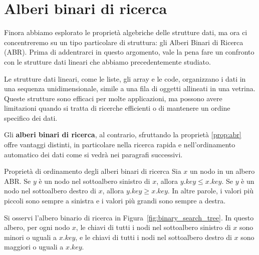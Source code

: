 \section{Alberi binari di ricerca}
Finora abbiamo esplorato le proprietà algebriche delle strutture dati, ma ora ci concentreremo su un tipo particolare di struttura: gli Alberi Binari di Ricerca (ABR). Prima di addentrarci in questo argomento, vale la pena fare un confronto con le strutture dati lineari che abbiamo precedentemente studiato.

Le strutture dati lineari, come le liste, gli array e le code, organizzano i dati in una sequenza unidimensionale, simile a una fila di oggetti allineati in una vetrina. Queste strutture sono efficaci per molte applicazioni, ma possono avere limitazioni quando si tratta di ricerche efficienti o di mantenere un ordine specifico dei dati.

Gli \textbf{alberi binari di ricerca}, al contrario, sfruttando la proprietà \ref{prop:abr} offre vantaggi distinti, in particolare nella ricerca rapida e nell'ordinamento automatico dei dati come si vedrà nei paragrafi successivi.


\begin{axiombox}{Proprietà di ordinamento degli alberi binari di ricerca}\label{prop:abr}
Sia $x$ un nodo in un albero \textsc{ABR}. Se $y$ è un nodo nel sottoalbero sinistro di $x$, allora $y.key \leq x.key$. Se $y$ è un nodo nel sottoalbero destro di $x$, allora $y.key \geq x.key$. In altre parole, i valori più piccoli sono sempre a sinistra e i valori più grandi sono sempre a destra.
\end{axiombox}


\begin{example}
	Si osservi l'albero binario di ricerca in Figura~\ref{fig:binary_search_tree}. In questo albero, per ogni nodo $x$, le chiavi di tutti i nodi nel sottoalbero sinistro di $x$ sono minori o uguali a $x.key$, e le chiavi di tutti i nodi nel sottoalbero destro di $x$ sono maggiori o uguali a $x.key$.

\begin{center}
\label{fig:binary_search_tree}
\end{center}
\end{example}

